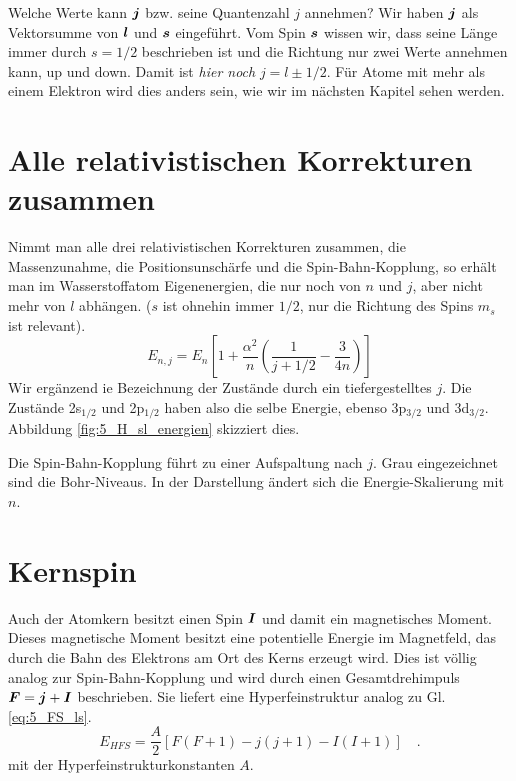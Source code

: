 Welche Werte kann $\boldsymbol{j}$ bzw. seine Quantenzahl $j$ annehmen? Wir haben $\boldsymbol{j}$ als Vektorsumme von $\boldsymbol{l}$ und $\boldsymbol{s}$ eingeführt. Vom Spin $\boldsymbol{s}$ wissen wir, dass seine Länge immer durch $s=1/2$ beschrieben ist und die Richtung nur zwei Werte annehmen kann, up und down. Damit ist \emph{hier noch} $j = l \pm 1/2$. Für Atome mit mehr als einem Elektron wird dies anders sein, wie wir im nächsten Kapitel sehen werden.


\section{Alle relativistischen Korrekturen zusammen}

Nimmt man alle drei relativistischen Korrekturen zusammen, die Massenzunahme, die Positionsunschärfe und die Spin-Bahn-Kopplung, so erhält man im Wasserstoffatom Eigenenergien, die nur noch von $n$ und $j$, aber nicht mehr von $l$ abhängen. ($s$ ist ohnehin immer $1/2$, nur die Richtung des Spins $m_s$ ist relevant).
\begin{equation}
    E_{n,j} = E_n \left[ 1 + \frac{\alpha^2}{n} \left( \frac{1}{j + 1/2} - \frac{3}{4n} \right) \right]
\end{equation}
Wir ergänzend ie Bezeichnung der   Zustände durch ein tiefergestelltes $j$. Die Zustände 2s$_{1/2}$ und 2p$_{1/2}$ haben also die selbe Energie, ebenso  3p$_{3/2}$ und 3d$_{3/2}$. Abbildung \ref{fig:5_H_sl_energien} skizziert dies.

\begin{marginfigure}[-60mm]
    \caption{Die Spin-Bahn-Kopplung führt zu einer Aufspaltung nach $j$. Grau eingezeichnet sind die Bohr-Niveaus. In der Darstellung ändert sich die Energie-Skalierung mit $n$.}
    \label{fig:5_H_sl_energien}
\end{marginfigure} 



\section{Kernspin}

Auch der Atomkern besitzt einen Spin $\boldsymbol{I}$ und damit ein magnetisches Moment. Dieses magnetische Moment besitzt eine potentielle Energie im Magnetfeld, das durch die Bahn des Elektrons am Ort des Kerns erzeugt wird. Dies ist völlig analog zur Spin-Bahn-Kopplung und wird durch einen Gesamtdrehimpuls $\boldsymbol{F} = \boldsymbol{j} + \boldsymbol{I}$ beschrieben. Sie liefert eine Hyperfeinstruktur analog zu Gl. \ref{eq:5_FS_ls}.
\begin{equation}
    E_{HFS}     = \frac{A}{2}  \left[ F(F+1) - j(j+1) - I(I+1) \right] \quad . 
\end{equation}
mit der Hyperfeinstrukturkonstanten $A$.


